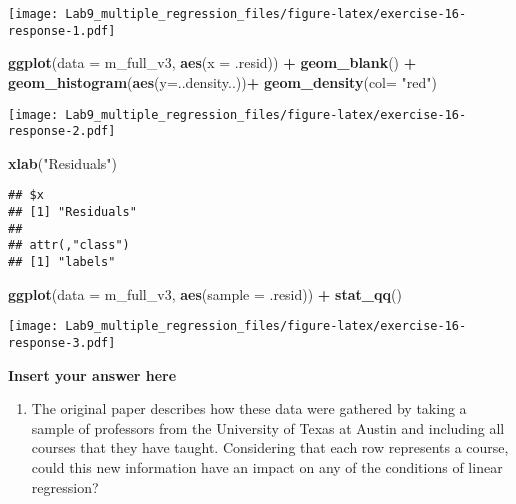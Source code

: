 \documentclass[
]{article}
\newenvironment{Shaded}{\begin{snugshade}}{\end{snugshade}}
\newcommand{\AttributeTok}[1]{\textcolor[rgb]{0.13,0.29,0.53}{#1}}
\newcommand{\FunctionTok}[1]{\textcolor[rgb]{0.13,0.29,0.53}{\textbf{#1}}}
\newcommand{\NormalTok}[1]{#1}
\newcommand{\SpecialCharTok}[1]{\textcolor[rgb]{0.81,0.36,0.00}{\textbf{#1}}}
\newcommand{\StringTok}[1]{\textcolor[rgb]{0.31,0.60,0.02}{#1}}
\providecommand{\tightlist}{%
  \setlength{\itemsep}{0pt}\setlength{\parskip}{0pt}}
\begin{document}
\texttt{[image: Lab9\_multiple\_regression\_files/figure-latex/exercise-16-response-1.pdf]}

\begin{Shaded}
\begin{Highlighting}[]
\FunctionTok{ggplot}\NormalTok{(}\AttributeTok{data =}\NormalTok{ m\_full\_v3, }\FunctionTok{aes}\NormalTok{(}\AttributeTok{x =}\NormalTok{ .resid)) }\SpecialCharTok{+}
  \FunctionTok{geom\_blank}\NormalTok{() }\SpecialCharTok{+}
  \FunctionTok{geom\_histogram}\NormalTok{(}\FunctionTok{aes}\NormalTok{(}\AttributeTok{y=}\NormalTok{..density..))}\SpecialCharTok{+}
  \FunctionTok{geom\_density}\NormalTok{(}\AttributeTok{col=} \StringTok{"red"}\NormalTok{)}
\end{Highlighting}
\end{Shaded}

\texttt{[image: Lab9\_multiple\_regression\_files/figure-latex/exercise-16-response-2.pdf]}

\begin{Shaded}
\begin{Highlighting}[]
  \FunctionTok{xlab}\NormalTok{(}\StringTok{"Residuals"}\NormalTok{) }
\end{Highlighting}
\end{Shaded}

\begin{verbatim}
## $x
## [1] "Residuals"
## 
## attr(,"class")
## [1] "labels"
\end{verbatim}

\begin{Shaded}
\begin{Highlighting}[]
\FunctionTok{ggplot}\NormalTok{(}\AttributeTok{data =}\NormalTok{ m\_full\_v3, }\FunctionTok{aes}\NormalTok{(}\AttributeTok{sample =}\NormalTok{ .resid)) }\SpecialCharTok{+}
  \FunctionTok{stat\_qq}\NormalTok{()}
\end{Highlighting}
\end{Shaded}

\texttt{[image: Lab9\_multiple\_regression\_files/figure-latex/exercise-16-response-3.pdf]}

\textbf{Insert your answer here}

\begin{enumerate}
\def\labelenumi{\arabic{enumi}.}
\setcounter{enumi}{16}
\tightlist
\item
  The original paper describes how these data were gathered by taking a
  sample of professors from the University of Texas at Austin and
  including all courses that they have taught. Considering that each row
  represents a course, could this new information have an impact on any
  of the conditions of linear regression?
\end{enumerate}
\end{document}
